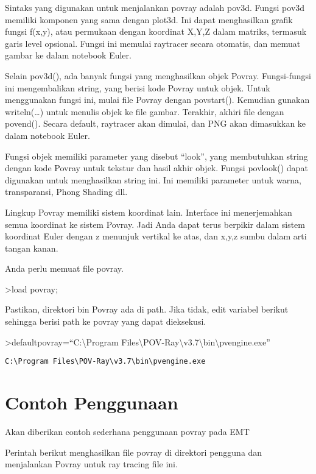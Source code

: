 \documentclass[
]{book}
\begin{document}
Sintaks yang digunakan untuk menjalankan povray adalah pov3d. Fungsi pov3d memiliki komponen yang sama dengan plot3d. Ini dapat menghasilkan grafik fungsi f(x,y), atau permukaan dengan koordinat X,Y,Z dalam matriks, termasuk garis level opsional. Fungsi ini memulai raytracer secara otomatis, dan memuat gambar ke dalam notebook Euler.

Selain pov3d(), ada banyak fungsi yang menghasilkan objek Povray. Fungsi-fungsi ini mengembalikan string, yang berisi kode Povray untuk objek. Untuk menggunakan fungsi ini, mulai file Povray dengan povstart(). Kemudian gunakan writeln(\ldots) untuk menulis objek ke file gambar. Terakhir, akhiri file dengan povend(). Secara default, raytracer akan dimulai, dan PNG akan dimasukkan ke dalam notebook Euler.

Fungsi objek memiliki parameter yang disebut ``look'', yang membutuhkan string dengan kode Povray untuk tekstur dan hasil akhir objek. Fungsi povlook() dapat digunakan untuk menghasilkan string ini. Ini memiliki parameter untuk warna, transparansi, Phong Shading dll.

Lingkup Povray memiliki sistem koordinat lain. Interface ini menerjemahkan semua koordinat ke sistem Povray. Jadi Anda dapat terus berpikir dalam sistem koordinat Euler dengan z menunjuk vertikal ke atas, dan x,y,z sumbu dalam arti tangan kanan.

Anda perlu memuat file povray.

\textgreater load povray;

Pastikan, direktori bin Povray ada di path. Jika tidak, edit variabel berikut sehingga berisi path ke povray yang dapat dieksekusi.

\textgreater defaultpovray=``C:\textbackslash Program Files\textbackslash POV-Ray\textbackslash v3.7\textbackslash bin\textbackslash pvengine.exe''

\begin{verbatim}
C:\Program Files\POV-Ray\v3.7\bin\pvengine.exe
\end{verbatim}

\section{Contoh Penggunaan}\label{contoh-penggunaan}

Akan diberikan contoh sederhana penggunaan povray pada EMT

Perintah berikut menghasilkan file povray di direktori pengguna dan menjalankan Povray untuk ray tracing file ini.
\end{document}
